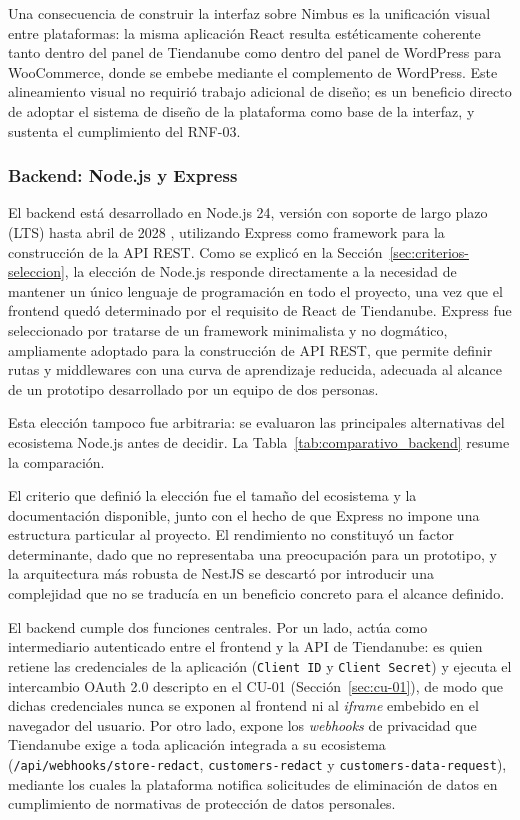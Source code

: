 Una consecuencia de construir la interfaz sobre Nimbus es la unificación visual entre plataformas: la misma aplicación React resulta estéticamente coherente tanto dentro del panel de Tiendanube como dentro del panel de WordPress para WooCommerce, donde se embebe mediante el complemento de WordPress. Este alineamiento visual no requirió trabajo adicional de diseño; es un beneficio directo de adoptar el sistema de diseño de la plataforma como base de la interfaz, y sustenta el cumplimiento del RNF-03.

\subsubsection{Backend: Node.js y Express}
\label{sec:backend-node-express}

El backend está desarrollado en Node.js 24, versión con soporte de largo plazo (LTS) hasta abril de 2028 \parencite{NodeRelease2026}, utilizando Express como framework para la construcción de la API REST. Como se explicó en la Sección~\ref{sec:criterios-seleccion}, la elección de Node.js responde directamente a la necesidad de mantener un único lenguaje de programación en todo el proyecto, una vez que el frontend quedó determinado por el requisito de React de Tiendanube. Express fue seleccionado por tratarse de un framework minimalista y no dogmático, ampliamente adoptado para la construcción de API REST, que permite definir rutas y middlewares con una curva de aprendizaje reducida, adecuada al alcance de un prototipo desarrollado por un equipo de dos personas.

Esta elección tampoco fue arbitraria: se evaluaron las principales alternativas del ecosistema Node.js antes de decidir. La Tabla~\ref{tab:comparativo_backend} resume la comparación.

El criterio que definió la elección fue el tamaño del ecosistema y la documentación disponible, junto con el hecho de que Express no impone una estructura particular al proyecto. El rendimiento no constituyó un factor determinante, dado que no representaba una preocupación para un prototipo, y la arquitectura más robusta de NestJS se descartó por introducir una complejidad que no se traducía en un beneficio concreto para el alcance definido.

El backend cumple dos funciones centrales. Por un lado, actúa como intermediario autenticado entre el frontend y la API de Tiendanube: es quien retiene las credenciales de la aplicación (\texttt{Client ID} y \texttt{Client Secret}) y ejecuta el intercambio OAuth 2.0 descripto en el CU-01 (Sección~\ref{sec:cu-01}), de modo que dichas credenciales nunca se exponen al frontend ni al \emph{iframe} embebido en el navegador del usuario. Por otro lado, expone los \emph{webhooks} de privacidad que Tiendanube exige a toda aplicación integrada a su ecosistema (\texttt{/api/webhooks/store-redact}, \texttt{customers-redact} y \texttt{customers-data-request}), mediante los cuales la plataforma notifica solicitudes de eliminación de datos en cumplimiento de normativas de protección de datos personales.

